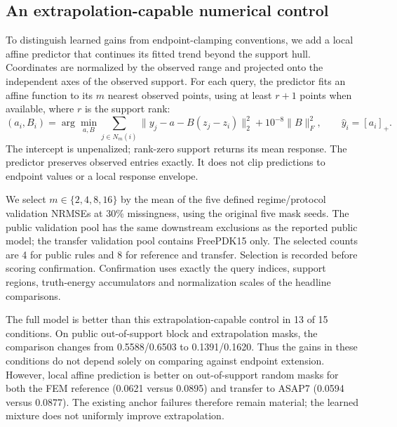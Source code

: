 \subsection{An extrapolation-capable numerical control}
\label{app:affine-control}

To distinguish learned gains from endpoint-clamping conventions, we add a
local affine predictor that continues its fitted trend beyond the support hull.
Coordinates are normalized by the observed range and projected onto the
independent axes of the observed support. For each query, the predictor fits
an affine function to its $m$ nearest observed points, using at least $r+1$
points when available, where $r$ is the support rank:
\begin{equation}
 (a_i,B_i)=\arg\min_{a,B}\sum_{j\in N_m(i)}
 \|y_j-a-B(z_j-z_i)\|_2^2+10^{-8}\|B\|_F^2,
 \qquad \hat y_i=[a_i]_+.
\label{eq:local-affine-control}
\end{equation}
The intercept is unpenalized; rank-zero support returns its mean response.
The predictor preserves observed entries exactly. It does not clip predictions
to endpoint values or a local response envelope.

We select $m\in\{2,4,8,16\}$ by the mean of the five defined
regime/protocol validation NRMSEs at 30\% missingness, using the original five
mask seeds. The public validation pool has the same downstream exclusions as
the reported public model; the transfer validation pool contains FreePDK15
only. The selected counts are 4 for public rules and 8 for reference and
transfer. Selection is recorded before scoring confirmation. Confirmation
uses exactly the query indices, support regions, truth-energy accumulators
and normalization scales of the headline comparisons.

\begin{table}[htbp]
\centering
\caption{\textbf{Local affine extrapolation versus the support anchor and full
model.} Confirmation NRMSE at 30\% missingness; lower is better.
The affine predictor can extrapolate outside support and its neighbor count
is selected only on validation. Bold marks the lowest value; underlining marks our second-best value
in each condition.}
\label{tab:affine-control}
\end{table}

The full model is better than this extrapolation-capable control in 13 of 15
conditions. On public out-of-support block and extrapolation masks, the
comparison changes from 0.5588/0.6503 to 0.1391/0.1620. Thus the gains in these
conditions do not depend solely on comparing against endpoint extension.
However, local affine prediction is better on out-of-support random masks
for both the FEM reference (0.0621 versus 0.0895) and transfer to ASAP7
(0.0594 versus 0.0877). The existing anchor failures therefore remain material;
the learned mixture does not uniformly improve extrapolation.

